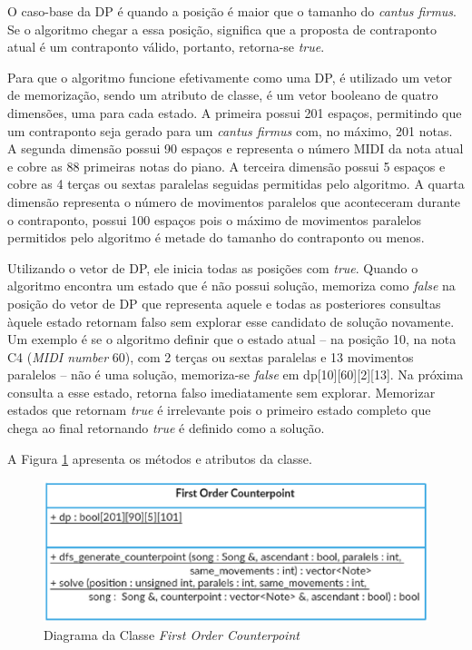       O caso-base da DP é quando a posição é maior que o tamanho do \textit{cantus firmus}. Se o algoritmo chegar a essa posição, significa que a proposta de contraponto atual é um contraponto válido, portanto, retorna-se \textit{true}.

      Para que o algoritmo funcione efetivamente como uma DP, é utilizado um vetor de memorização, sendo um atributo de classe, é um vetor booleano de quatro dimensões, uma para cada estado. A primeira possui 201 espaços, permitindo que um contraponto seja gerado para um \textit{cantus firmus} com, no máximo, 201 notas. A segunda dimensão possui 90 espaços e representa o número MIDI da nota atual e cobre as 88 primeiras notas do piano. A terceira dimensão possui 5 espaços e cobre as 4 terças ou sextas paralelas seguidas permitidas pelo algoritmo. A quarta dimensão representa o número de movimentos paralelos que aconteceram durante o contraponto, possui 100 espaços pois o máximo de movimentos paralelos permitidos pelo algoritmo é metade do tamanho do contraponto ou menos.

      Utilizando o vetor de DP, ele inicia todas as posições com \textit{true}. Quando o algoritmo encontra um estado que é não possui solução, memoriza como \textit{false} na posição do vetor de DP que representa aquele e todas as posteriores consultas àquele estado retornam falso sem explorar esse candidato de solução novamente. Um exemplo é se o algoritmo definir que o estado atual -- na posição 10, na nota C4 (\textit{MIDI number} 60), com 2 terças ou sextas paralelas e 13 movimentos paralelos -- não é uma solução, memoriza-se \textit{false} em dp[10][60][2][13]. Na próxima consulta a esse estado, retorna falso imediatamente sem explorar. Memorizar estados que retornam \textit{true} é irrelevante pois o primeiro estado completo que chega ao final retornando \textit{true} é definido como a solução.

      A Figura \ref{firstordercounterpointclass} apresenta os métodos e atributos da classe.

      \begin{figure}[htb]
        \centering
        \includegraphics[scale=0.7]{figuras/firstordercounterpointclass.eps}
        \caption{Diagrama da Classe \textit{First Order Counterpoint}}
        \label{firstordercounterpointclass}
      \end{figure}


